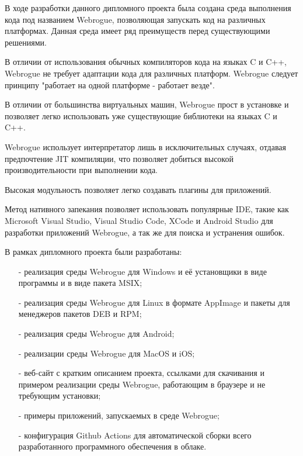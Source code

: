 В ходе разработки данного дипломного проекта была создана среда выполнения кода под названием Webrogue, позволяющая запускать код на различных платформах.
Данная среда имеет ряд преимуществ перед существующими решениями.

В отличии от использования обычных компиляторов кода на языках C и C++, Webrogue не требует адаптации кода для различных платформ. 
Webrogue следует принципу "работает на одной платформе - работает везде".

В отличии от большинства виртуальных машин, Webrogue прост в установке и позволяет легко использовать уже существующие библиотеки на языках C и C++.

Webrogue использует интерпретатор лишь в исключительных случаях, отдавая предпочтение JIT компиляции, что позволяет добиться высокой производительности при выполнении кода.

Высокая модульность позволяет легко создавать плагины для приложений.

Метод нативного запекания позволяет использовать популярные IDE, такие как Microsoft Visual Studio, Visual Studio Code, XCode и Android Studio для разработки приложений Webrogue, а так же для поиска и устранения ошибок.

В рамках дипломного проекта были разработаны:
\begin{itemize}
    \item[-] реализация среды Webrogue для Windows и её установщики в виде программы и в виде пакета MSIX;
    \item[-] реализация среды Webrogue для Linux в формате AppImage и пакеты для менеджеров пакетов DEB и RPM;
    \item[-] реализация среды Webrogue для Android;
    \item[-] реализации среды Webrogue для MacOS и iOS;
    \item[-] веб-сайт с кратким описанием проекта, ссылками для скачивания и примером реализации среды Webrogue, работающим в браузере и не требующим установки;
    \item[-] примеры приложений, запускаемых в среде Webrogue;
    \item[-] конфигурация Github Actions для автоматической сборки всего разработанного программного обеспечения в облаке.
\end{itemize}

